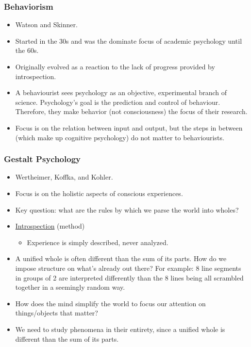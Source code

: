 \documentclass[]{article}
\begin{document}
			\subsubsection{Behaviorism}
				\begin{itemize}
					\item Watson and Skinner.
					\item Started in the 30s and was the dominate focus of academic psychology until the 60s.
					\item Originally evolved as a reaction to the lack of progress provided by introspection.
					\item A behaviourist sees psychology as an objective, experimental branch of science. Psychology's goal is the prediction and control of behaviour. Therefore, they make behavior (not consciousness) the focus of their research.
					\item Focus is on the relation between input and output, but the steps in between (which make up cognitive psychology) do not matter to behaviourists.
				\end{itemize}

			\subsubsection{Gestalt Psychology}
				\begin{itemize}
					\item Wertheimer, Koffka, and Kohler.
					\item Focus is on the holistic aspects of conscious experiences.
					\item Key question: what are the rules by which we parse the world into wholes?
					\item \underline{Introspection} (method)
						\begin{itemize}
							\item Experience is simply described, never analyzed.
						\end{itemize}
					\item A unified whole is often different than the sum of its parts. How do we impose structure on what's already out there? For example: 8 line segments in groups of 2 are interpreted differently than the 8 lines being all scrambled together in a seemingly random way.
					\item How does the mind simplify the world to focus our attention on things/objects that matter?
					\item We need to study phenomena in their entirety, since a unified whole is different than the sum of its parts.
				\end{itemize}
\end{document}

